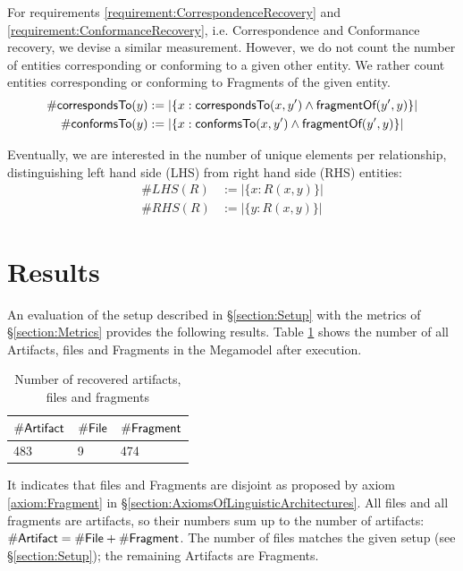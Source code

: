 For requirements \ref{requirement:CorrespondenceRecovery} and \ref{requirement:ConformanceRecovery}, i.e. \gls{Correspondence} and \gls{Conformance} recovery, we devise a similar measurement.
However, we do not count the number of entities corresponding or conforming to a given other entity.
We rather count entities corresponding or conforming to \glspl{Fragment} of the given entity.
\begin{align*}
\#\textsf{correspondsTo}(y) &:=
|\{ x : \textsf{correspondsTo}(x,y') \wedge \textsf{fragmentOf}(y',y)  \}|
\\
\#\textsf{conformsTo}(y) &:=
|\{ x : \textsf{conformsTo}(x,y') \wedge \textsf{fragmentOf}(y',y)  \}|
\end{align*}

Eventually, we are interested in the number of unique elements per relationship, distinguishing left hand side (LHS) from right hand side (RHS) entities: 
\begin{align*}
\#LHS(R) &:= |\{ x : R(x,y) \}| \\
\#RHS(R) &:= |\{ y : R(x,y) \}| 
\end{align*}

\section{Results}
\label{section:Results}
An evaluation of the setup described in §\ref{section:Setup} with the metrics of §\ref{section:Metrics} provides the following results.
Table \ref{table:NumberOfRecoveredArtifactsFilesAndFragments} shows the number of all \glspl{Artifact}, files and \glspl{Fragment} in the \gls{Megamodel} after execution.
\begin{table}[h!]
\begin{center}
\begin{tabular}{|l|l|l|}
\hline
$\#\textsf{Artifact}$ & $\#\textsf{File}$ & $\#\textsf{Fragment}$
\\ \hline
483 & 9 & 474 
\\ \hline
\end{tabular}
\end{center}
\caption{Number of recovered artifacts, files and fragments}
\label{table:NumberOfRecoveredArtifactsFilesAndFragments}
\end{table}
It indicates that files and \glspl{Fragment} are disjoint as proposed by axiom \ref{axiom:Fragment} in §\ref{section:AxiomsOfLinguisticArchitectures}.
All files and all fragments are artifacts, so their numbers sum up to the number of artifacts: $\#\textsf{Artifact} = \#\textsf{File} + \#\textsf{Fragment}$.
The number of files matches the given setup (see §\ref{section:Setup}); the remaining \glspl{Artifact} are \glspl{Fragment}.

